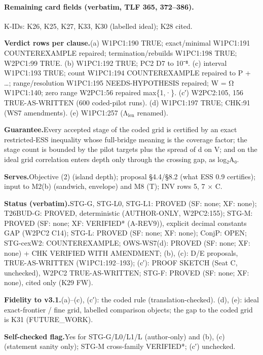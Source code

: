 \paragraph{Remaining card fields (verbatim, TLF 365, 372–386).}
{\small
\par\noindent K-IDs: K26, K25, K27, K33, K30 (labelled ideal); K28 cited.
\par\smallskip\noindent\textbf{Verdict rows per clause.}\enspace (a) W1PC1:190 TRUE; exact/minimal W1PC1:191 COUNTEREXAMPLE repaired; termination/rebuilds W1PC1:198 TRUE; W2PC1:99 TRUE. (b) W1PC1:192 TRUE; PC2 D7 to 10⁻⁸. (c) interval W1PC1:193 TRUE; count W1PC1:194 COUNTEREXAMPLE repaired to P + …; range/resolution W1PC1:195 NEEDS-HYPOTHESIS repaired; W = Ω W1PC1:140; zero range W2PC1:56 repaired max\{1,·\}. (c′) W2PC2:105, 156 TRUE-AS-WRITTEN (600 coded-pilot runs). (d) W1PC1:197 TRUE; CHK:91 (WS7 amendments). (e) W1PC1:257 (Λ$_{\mathrm{len}}$ renamed).
\par\smallskip\noindent\textbf{Guarantee.}\enspace Every accepted stage of the coded grid is certified by an exact restricted-ESS inequality whose full-bridge meaning is the coverage factor; the stage count is bounded by the pilot targets plus the spread of d on V; and on the ideal grid correlation enters depth only through the crossing gap, as log₂A₀.
\par\smallskip\noindent\textbf{Serves.}\enspace Objective (2) (island depth); proposal §4.4/§8.2 (what ESS 0.9 certifies); input to M2(b) (sandwich, envelope) and M8 (T); INV rows 5, 7 × C.
\par\smallskip\noindent\textbf{Status (verbatim).}\enspace STG-G, STG-L0, STG-L1: PROVED (SF: none; XF: none); T26BUD-G: PROVED, deterministic (AUTHOR-ONLY, W2PC2:155); STG-M: PROVED (SF: none; XF: VERIFIED* (A-REV9)), explicit decimal constants GAP (W2PC2 C14); STG-L: PROVED (SF: none; XF: none); ConjP: OPEN; STG-cexW2: COUNTEREXAMPLE; OWS-WS7(d): PROVED (SF: none; XF: none) + CHK VERIFIED WITH AMENDMENT; (b), (c): D/E proposals, TRUE-AS-WRITTEN (W1PC1:192–193); (c′): PROOF SKETCH (Seat C, unchecked), W2PC2 TRUE-AS-WRITTEN; STG-F: PROVED (SF: none; XF: none), cited only (K29 FW).
\par\smallskip\noindent\textbf{Fidelity to v3.1.}\enspace (a)–(c), (c′): the coded rule (translation-checked). (d), (e): ideal exact-frontier / fine grid, labelled comparison objects; the gap to the coded grid is K31 (FUTURE\_WORK).
\par\smallskip\noindent\textbf{Self-checked flag.}\enspace Yes for STG-G/L0/L1/L (author-only) and (b), (c) (statement sanity only); STG-M cross-family VERIFIED*; (c′) unchecked.
}
